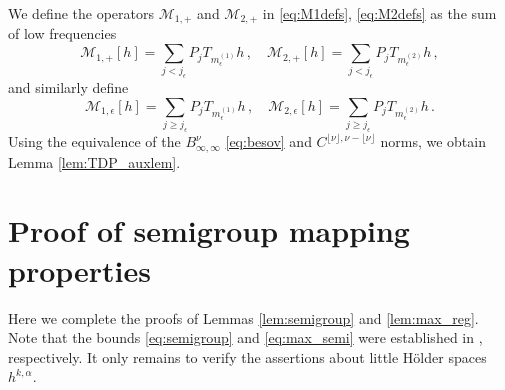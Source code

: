 \documentclass[11pt,reqno]{amsart}
\newcommand{\mc}[1]{\mathcal{#1}}
\theoremstyle{definition}
\begin{document}
%
%
We define the operators $\mc{M}_{1,+}$ and $\mc{M}_{2,+}$ in \eqref{eq:M1defs}, \eqref{eq:M2defs} as the sum of low frequencies 
\begin{equation}
  \mc{M}_{1,+}[h] = \sum_{j< j_\epsilon} P_jT_{m^{(1)}_\epsilon}h\,, \quad
  \mc{M}_{2,+}[h] = \sum_{j< j_\epsilon} P_jT_{m^{(2)}_\epsilon}h\,,
\end{equation}
and similarly define
\begin{equation}
  \mc{M}_{1,\epsilon}[h] = \sum_{j\ge j_\epsilon} P_jT_{m^{(1)}_\epsilon}h\,, \quad
  \mc{M}_{2,\epsilon}[h] = \sum_{j\ge j_\epsilon} P_jT_{m^{(2)}_\epsilon}h\,.
\end{equation}
%
Using the equivalence of the $B^{\nu}_{\infty,\infty}$ \eqref{eq:besov} and $C^{\lfloor\nu\rfloor,\nu-\lfloor\nu\rfloor}$ norms, we obtain Lemma \ref{lem:TDP_auxlem}.


\section{Proof of semigroup mapping properties}\label{sec:h4alpha}
Here we complete the proofs of Lemmas \ref{lem:semigroup} and \ref{lem:max_reg}. Note that the bounds \eqref{eq:semigroup} and \eqref{eq:max_semi} were established in \cite[Lemmas 2.2 and 2.3]{ohm2024free}, respectively. It only remains to verify the assertions about little H\"older spaces $h^{k,\alpha}$.
\end{document}
